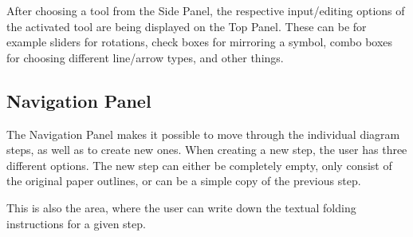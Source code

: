 After choosing a tool from the Side Panel, the respective input/editing options of the activated tool are being displayed on the Top Panel. These can be for example sliders for rotations, check boxes for mirroring a symbol, combo boxes for choosing different line/arrow types, and other things.


\subsection{Navigation Panel}
\label{sec:navigationPanel}

The Navigation Panel makes it possible to move through the individual diagram steps, as well as to create new ones. When creating a new step, the user has three different options. The new step can either be completely empty, only consist of the original paper outlines, or can be a simple copy of the previous step.

This is also the area, where the user can write down the textual folding instructions for a given step.
